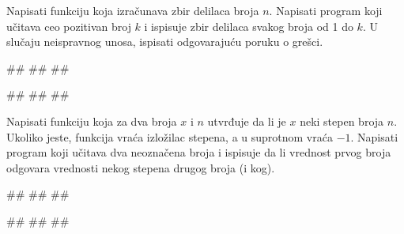 \begin{Exercise}[label=FUN_03] 
 Napisati funkciju  koja izračunava
 zbir delilaca broja $n$. Napisati program koji učitava ceo pozitivan broj $k$ i
 ispisuje zbir delilaca svakog broja od 1 do $k$.
U slučaju neispravnog unosa, ispisati odgovarajuću poruku o grešci.

\begin{miditest}
\begin{upotreba}{1}
#\naslovInt#
##
##
\end{upotreba}
\end{miditest}
\begin{miditest}
\begin{upotreba}{2}
#\naslovInt#
##
##
\end{upotreba}
\end{miditest}

\end{Exercise}
\ifresenja 
\begin{Answer}[ref=FUN_03]
\end{Answer} 
\fi


\begin{Exercise}[label=FUN_04] 
Napisati funkciju  koja
za dva broja $x$ i $n$ utvrđuje da li je $x$ neki stepen broja
$n$. Ukoliko jeste, funkcija vraća izložilac stepena, a u suprotnom
vraća $-1$. Napisati program koji učitava dva neoznačena broja i ispisuje
da li vrednost prvog broja odgovara vrednosti nekog stepena drugog broja (i kog).

\begin{miditest}
\begin{upotreba}{1}
#\naslovInt#
##
##
\end{upotreba}
\end{miditest}
\begin{miditest}
\begin{upotreba}{2}
#\naslovInt#
##
##
\end{upotreba}
\end{miditest}

\end{Exercise}
\ifresenja 
\begin{Answer}[ref=FUN_04]
\end{Answer} 
\fi


